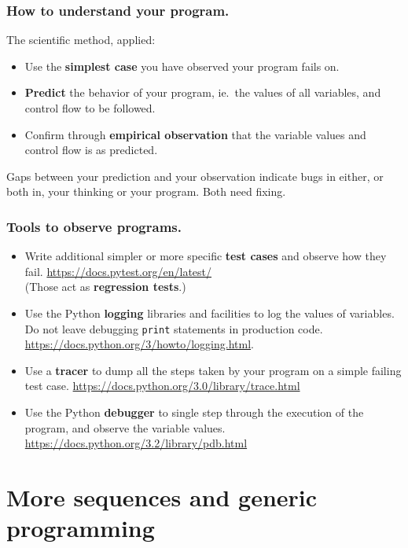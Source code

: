 \documentclass{beamer} %
\newcommand\emc[1]{\textcolor{brightblue}{\textbf{#1}}}
\begin{document}
\begin{frame}
\frametitle{How to understand your program.}

The scientific method, applied:
\begin{itemize}
	\item Use the \emc{simplest case} you have observed your program fails on.
	\item \emc{Predict} the behavior of your program, ie.\ the values of all variables, and control flow to be followed.
	\item Confirm through \emc{empirical observation} that the variable values and control flow is as predicted.
\end{itemize}

\vspace{3mm}
Gaps between your prediction and your observation indicate bugs in either, or both in, your thinking or your program. Both need fixing.

\end{frame}

\begin{frame}
\frametitle{Tools to observe programs.}

\begin{itemize}
\item Write additional simpler or more specific \emc{test cases} and observe how they fail. \url{https://docs.pytest.org/en/latest/} \\ (Those act as \emc{regression tests}.)
\item Use the Python \emc{logging} libraries and facilities to log the values of variables. Do not leave debugging \texttt{print} statements in production code. \url{https://docs.python.org/3/howto/logging.html}.
\item Use a \emc{tracer} to dump all the steps taken by your program on a simple failing test case. \url{https://docs.python.org/3.0/library/trace.html}
\item Use the Python \emc{debugger} to single step through the execution of the program, and observe the variable values. \url{https://docs.python.org/3.2/library/pdb.html}
\end{itemize}

\end{frame}

\section{More sequences and generic programming}
\end{document}
